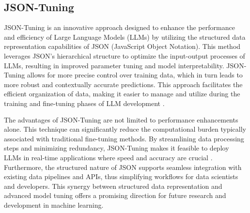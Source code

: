 \subsection*{JSON-Tuning}
JSON-Tuning is an innovative approach designed to enhance the performance and efficiency of Large Language Models (LLMs) by utilizing the structured data representation capabilities of JSON (JavaScript Object Notation). This method leverages JSON's hierarchical structure to optimize the input-output processes of LLMs, resulting in improved parameter tuning and model interpretability. JSON-Tuning allows for more precise control over training data, which in turn leads to more robust and contextually accurate predictions. This approach facilitates the efficient organization of data, making it easier to manage and utilize during the training and fine-tuning phases of LLM development \cite{zheng2024llamafactory}.

The advantages of JSON-Tuning are not limited to performance enhancements alone. This technique can significantly reduce the computational burden typically associated with traditional fine-tuning methods. By streamlining data processing steps and minimizing redundancy, JSON-Tuning makes it feasible to deploy LLMs in real-time applications where speed and accuracy are crucial \cite{zhu2024lift}. Furthermore, the structured nature of JSON supports seamless integration with existing data pipelines and APIs, thus simplifying workflows for data scientists and developers. This synergy between structured data representation and advanced model tuning offers a promising direction for future research and development in machine learning.